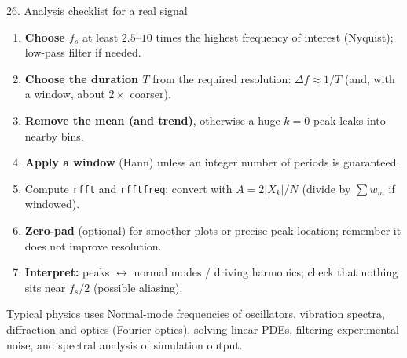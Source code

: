 \documentclass[aspectratio=169,10pt]{beamer}
\begin{document}
\begin{frame}{26. Analysis checklist for a real signal}
  \small
  \begin{enumerate}
    \item \textbf{Choose $f_s$} at least $2.5$--$10$ times the highest frequency of interest (Nyquist); low-pass filter if needed.
    \item \textbf{Choose the duration $T$} from the required resolution: $\Delta f\approx1/T$ (and, with a window, about $2\times$ coarser).
    \item \textbf{Remove the mean (and trend)}, otherwise a huge $k=0$ peak leaks into nearby bins.
    \item \textbf{Apply a window} (Hann) unless an integer number of periods is guaranteed.
    \item Compute \texttt{rfft} and \texttt{rfftfreq}; convert with $A=2|X_k|/N$ (divide by $\sum w_m$ if windowed).
    \item \textbf{Zero-pad} (optional) for smoother plots or precise peak location; remember it does not improve resolution.
    \item \textbf{Interpret:} peaks $\leftrightarrow$ normal modes / driving harmonics; check that nothing sits near $f_s/2$ (possible aliasing).
  \end{enumerate}
  \begin{keybox}{Typical physics uses}
    Normal-mode frequencies of oscillators, vibration spectra, diffraction and optics (Fourier optics), solving linear PDEs, filtering experimental noise, and spectral analysis of simulation output.
  \end{keybox}
\end{frame}
\end{document}

